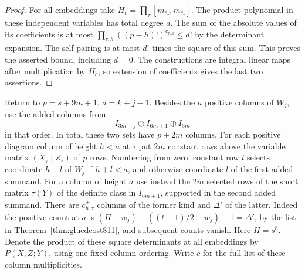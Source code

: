 \documentclass[a4paper,11pt]{article}
\theoremstyle{definition}
\theoremstyle{remark}
\numberwithin{equation}{section}
\begin{document}
\begin{proof}
For all embeddings take \(H_c=\prod_\tau
[m_{\widehat c_\tau},m_{\widehat c_\tau}]\).
The product polynomial in these independent variables has
total degree \(d\). The sum of the absolute values of its
coefficients is at most \(\prod_{\tau,h}((p-h)!)^{c_{\tau,h}}
\le d!\) by the determinant expansion. The self-pairing
is at most \(d!\) times the square of this sum. This proves
the asserted bound, including \(d=0\). The constructions
are integral linear maps after multiplication by \(H_c\),
so extension of coefficients gives the last two assertions.
\end{proof}

Return to \(p=s+9m+1\), \(a=k+j-1\). Besides the \(a\)
positive columns of \(W_j\), use the added columns from
\[
       I_{3m-j}\oplus I_{6m+1}\oplus I_{3m}
\]
in that order. In total these two sets have \(p+2m\)
columns. For each positive diagram column of height \(h<a\)
at \(\tau\) put \(2m\) constant rows above the variable
matrix \((X_\tau\mid Z_\tau)\) of \(p\) rows. Numbering
from zero, constant row \(l\) selects coordinate \(h+l\)
of \(W_j\) if \(h+l<a\), and otherwise coordinate \(l\)
of the first added summand. For a column of height \(a\)
use instead the \(2m\) selected rows of the short matrix
\(\tau(Y)\) of the definite class in \(I_{6m+1}\), supported
in the second added summand. There are \(c^+_{h,\tau}\) columns
of the former kind and \(\Delta'\) of the latter. Indeed the
positive count at \(a\) is
\((H-w_j)-((t-1)/2-w_j)-1=\Delta'\), by the list in
Theorem~\ref{thm:gluedcost811}, and subsequent counts vanish.
Here \(H=s^8\). Denote the product of these square determinants
at all embeddings by \(P(X,Z;Y)\), using one fixed column
ordering. Write \(c\) for the full list of these column
multiplicities.
\end{document}
